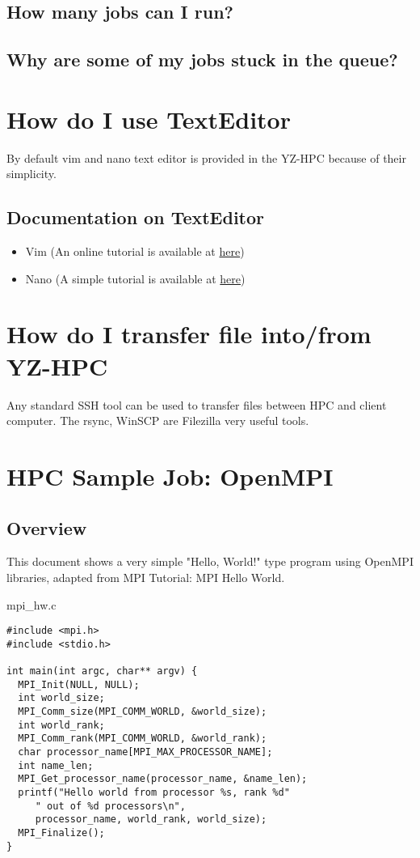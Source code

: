 \documentclass[11pt]{article}
\numberwithin{figure}{section}
\begin{document}
\subsection{How many jobs can I run?}
\subsection{Why are some of my jobs stuck in the queue?}

\section{How do I use TextEditor}
By default vim and nano text editor is provided in the YZ-HPC because of their
simplicity.

\subsection{Documentation on TextEditor}
\begin{itemize}
    \item Vim (An online tutorial is available at \href{http://www.openvim.com}{here})
    \item Nano (A simple tutorial is available at \href{https://staffwww.fullcoll.edu/sedwards/Nano/IntroToNano.html}{here}) 
\end{itemize}

\section{How do I transfer file into/from YZ-HPC}
Any standard SSH tool can be used to transfer files between HPC and client
computer. The rsync, WinSCP are Filezilla very useful tools.


\section{HPC Sample Job: OpenMPI}
\subsection{Overview}
This document shows a very simple "Hello, World!" type program using OpenMPI
libraries, adapted from MPI Tutorial: MPI Hello World.

mpi\_hw.c

\begin{lstlisting}[frame=single]
#include <mpi.h>
#include <stdio.h>
 
int main(int argc, char** argv) {
  MPI_Init(NULL, NULL);
  int world_size;
  MPI_Comm_size(MPI_COMM_WORLD, &world_size);
  int world_rank;
  MPI_Comm_rank(MPI_COMM_WORLD, &world_rank);
  char processor_name[MPI_MAX_PROCESSOR_NAME];
  int name_len;
  MPI_Get_processor_name(processor_name, &name_len);
  printf("Hello world from processor %s, rank %d"
     " out of %d processors\n",
     processor_name, world_rank, world_size);
  MPI_Finalize();
}
\end{lstlisting}
\end{document}
